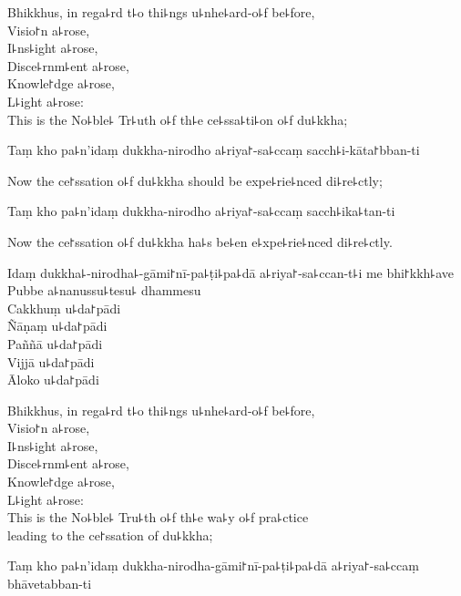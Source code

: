 \enlargethispage{\baselineskip}

\begin{english}
  Bhikkhus, in rega꜕rd t꜕o thi꜕ngs u꜕nhe꜕ard-o꜕f be꜕fore,\\
  Visio꜓n a꜕rose,\\
  I꜕ns꜕ight a꜕rose,\\
  Disce꜕rnm꜕ent a꜕rose,\\
  Knowle꜓dge a꜕rose,\\
  L꜕ight a꜕rose:\\
  This is the No꜕ble꜕ Tr꜕uth o꜕f th꜕e ce꜕ssa꜕ti꜕on o꜕f du꜕kkha;
\end{english}

\clearpage

Taṃ kho pa꜕n'idaṃ dukkha-nirodho a꜕riya꜓-sa꜕ccaṃ sacch꜕i-kāta꜓bban-ti

\begin{english}
  Now the ce꜓ssation o꜕f du꜕kkha should be expe꜕rie꜕nced di꜕re꜕ctly;
\end{english}

Taṃ kho pa꜕n'idaṃ dukkha-nirodho a꜕riya꜓-sa꜕ccaṃ sacch꜕ika꜕tan-ti

\begin{english}
  Now the ce꜓ssation o꜕f du꜕kkha ha꜕s be꜕en e꜕xpe꜕rie꜕nced di꜕re꜕ctly.
\end{english}

Idaṃ dukkha꜕-nirodha꜕-gāmi꜓nī-pa꜕ṭi꜕pa꜕dā a꜕riya꜓-sa꜕ccan-t꜕i me bhi꜓kkh꜕ave\\
Pubbe a꜕nanussu꜕tesu꜕ dhammesu\\
Cakkhuṃ u꜕da꜓pādi\\
Ñāṇaṃ u꜕da꜓pādi\\
Paññā u꜕da꜓pādi\\
Vijjā u꜕da꜓pādi\\
Āloko u꜕da꜓pādi

\begin{english}
  Bhikkhus, in rega꜕rd t꜕o thi꜕ngs u꜕nhe꜕ard-o꜕f be꜕fore,\\
  Visio꜓n a꜕rose,\\
  I꜕ns꜕ight a꜕rose,\\
  Disce꜕rnm꜕ent a꜕rose,\\
  Knowle꜓dge a꜕rose,\\
  L꜕ight a꜕rose:\\
  This is the No꜕ble꜕ Tru꜕th o꜕f th꜕e wa꜕y o꜕f pra꜕ctice\\
  leading to the ce꜓ssation of du꜕kkha;
\end{english}

Taṃ kho pa꜕n'idaṃ dukkha-nirodha-gāmi꜓nī-pa꜕ṭi꜕pa꜕dā a꜕riya꜓-sa꜕ccaṃ bhāvetabban-ti

